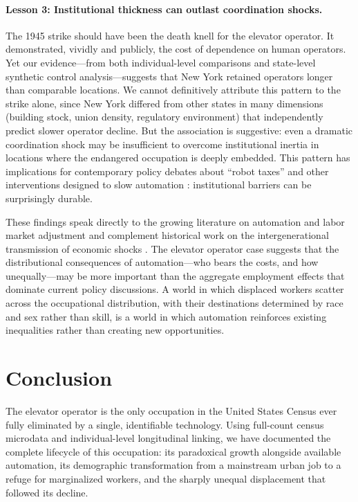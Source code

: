 \documentclass[12pt]{article}
\begin{document}
\paragraph{Lesson 3: Institutional thickness can outlast coordination shocks.} The 1945 strike should have been the death knell for the elevator operator. It demonstrated, vividly and publicly, the cost of dependence on human operators. Yet our evidence---from both individual-level comparisons and state-level synthetic control analysis---suggests that New York retained operators longer than comparable locations. We cannot definitively attribute this pattern to the strike alone, since New York differed from other states in many dimensions (building stock, union density, regulatory environment) that independently predict slower operator decline. But the association is suggestive: even a dramatic coordination shock may be insufficient to overcome institutional inertia in locations where the endangered occupation is deeply embedded. This pattern has implications for contemporary policy debates about ``robot taxes'' and other interventions designed to slow automation \citep{acemoglu2020, seamans2024}: institutional barriers can be surprisingly durable.

These findings speak directly to the growing literature on automation and labor market adjustment \citep{dauth2021, webb2020, hicks2023} and complement historical work on the intergenerational transmission of economic shocks \citep{bleakleyferrie2016}. The elevator operator case suggests that the distributional consequences of automation---who bears the costs, and how unequally---may be more important than the aggregate employment effects that dominate current policy discussions. A world in which displaced workers scatter across the occupational distribution, with their destinations determined by race and sex rather than skill, is a world in which automation reinforces existing inequalities rather than creating new opportunities.



\section{Conclusion} \label{sec:conclusion}

The elevator operator is the only occupation in the United States Census ever fully eliminated by a single, identifiable technology. Using full-count census microdata and individual-level longitudinal linking, we have documented the complete lifecycle of this occupation: its paradoxical growth alongside available automation, its demographic transformation from a mainstream urban job to a refuge for marginalized workers, and the sharply unequal displacement that followed its decline.
\end{document}
